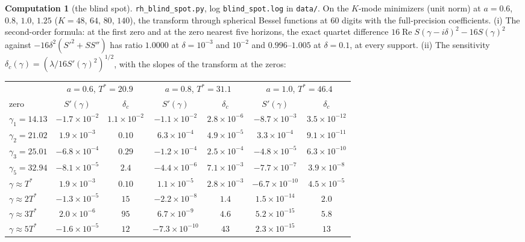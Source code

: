\documentclass[11pt]{article}
\theoremstyle{definition}
\newtheorem{computation}[theorem]{Computation}
\theoremstyle{remark}
\DeclareMathOperator{\Ree}{Re}
\newcommand{\Tst}{T^{*}}
\begin{document}
\begin{computation}[the blind spot]\label{comp:blind}
\sloppy \texttt{rh\_blind\_spot.py}, log \texttt{blind\_spot.log} in \texttt{data/}. On the $K$-mode minimizers (unit norm) at $a=0.6$, $0.8$, $1.0$, $1.25$ ($K=48$, $64$, $80$, $140$), the transform through spherical Bessel functions at $60$ digits with the full-precision coefficients. (i) The second-order formula: at the first zero and at the zero nearest five horizons, the exact quartet difference $16\Ree S(\gamma-i\delta)^2-16S(\gamma)^2$ against $-16\delta^2(S'^2+SS'')$ has ratio $1.0000$ at $\delta=10^{-3}$ and $10^{-2}$ and $0.996$--$1.005$ at $\delta=0.1$, at every support. (ii) The sensitivity $\delta_c(\gamma)=(\lambda/16S'(\gamma)^2)^{1/2}$, with the slopes of the transform at the zeros:
\begin{center}\small
\begin{tabular}{@{}l|cc|cc|cc@{}}
\toprule
& \multicolumn{2}{c|}{$a=0.6$, $\Tst=20.9$} & \multicolumn{2}{c|}{$a=0.8$, $\Tst=31.1$} & \multicolumn{2}{c}{$a=1.0$, $\Tst=46.4$}\\
zero & $S'(\gamma)$ & $\delta_c$ & $S'(\gamma)$ & $\delta_c$ & $S'(\gamma)$ & $\delta_c$\\
\midrule
$\gamma_1=14.13$ & $-1.7\times10^{-2}$ & $1.1\times10^{-2}$ & $-1.1\times10^{-2}$ & $2.8\times10^{-6}$ & $-8.7\times10^{-3}$ & $3.5\times10^{-12}$\\
$\gamma_2=21.02$ & $1.9\times10^{-3}$ & $0.10$ & $6.3\times10^{-4}$ & $4.9\times10^{-5}$ & $3.3\times10^{-4}$ & $9.1\times10^{-11}$\\
$\gamma_3=25.01$ & $-6.8\times10^{-4}$ & $0.29$ & $-1.2\times10^{-4}$ & $2.5\times10^{-4}$ & $-4.8\times10^{-5}$ & $6.3\times10^{-10}$\\
$\gamma_5=32.94$ & $-8.1\times10^{-5}$ & $2.4$ & $-4.4\times10^{-6}$ & $7.1\times10^{-3}$ & $-7.7\times10^{-7}$ & $3.9\times10^{-8}$\\
$\gamma\approx\Tst$ & $1.9\times10^{-3}$ & $0.10$ & $1.1\times10^{-5}$ & $2.8\times10^{-3}$ & $-6.7\times10^{-10}$ & $4.5\times10^{-5}$\\
$\gamma\approx2\Tst$ & $-1.3\times10^{-5}$ & $15$ & $-2.2\times10^{-8}$ & $1.4$ & $1.5\times10^{-14}$ & $2.0$\\
$\gamma\approx3\Tst$ & $2.0\times10^{-6}$ & $95$ & $6.7\times10^{-9}$ & $4.6$ & $5.2\times10^{-15}$ & $5.8$\\
$\gamma\approx5\Tst$ & $-1.6\times10^{-5}$ & $12$ & $-7.3\times10^{-10}$ & $43$ & $2.3\times10^{-15}$ & $13$\\

\end{tabular}
\end{center}
\end{computation}
\end{document}
